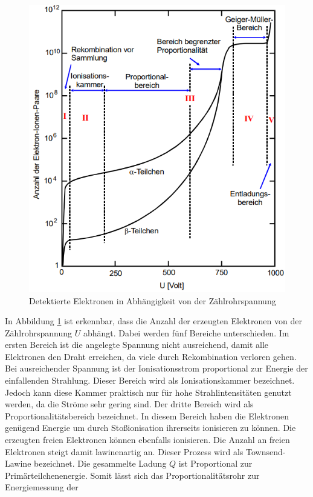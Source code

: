 \begin{figure}
    \centering
    \includegraphics[scale=0.6]{pics/Elektronen.png}
    \caption{Detektierte Elektronen in Abhängigkeit von der Zählrohrspannung}
    \label{fig:Elektronen}
  \end{figure}
In Abbildung \ref{fig:Elektronen} ist erkennbar, dass die Anzahl der erzeugten Elektronen von der Zählrohrspannung $U$ abhängt.
Dabei werden fünf Bereiche unterschieden. Im ersten Bereich ist die angelegte Spannung nicht ausreichend, damit alle Elektronen den Draht erreichen, da viele 
durch Rekombination verloren gehen.
Bei ausreichender Spannung ist der Ionisationsstrom proportional zur Energie der einfallenden Strahlung.
Dieser Bereich wird als Ionisationskammer bezeichnet.
Jedoch kann diese Kammer praktisch nur für hohe Strahlintensitäten genutzt werden, da die Ströme sehr gering sind.
Der dritte Bereich wird als Proportionalitätsbereich bezeichnet. In diesem Bereich haben die 
Elektronen genügend Energie um durch Stoßionisation ihrerseits ionisieren zu können.
Die erzeugten freien Elektronen können ebenfalls ionisieren. Die Anzahl an freien Elektronen steigt damit lawinenartig an. Dieser Prozess wird als
Townsend-Lawine bezeichnet. Die gesammelte Ladung $Q$ ist Proportional zur Primärteilchenenergie. Somit lässt sich das Proportionalitätsrohr zur Energiemessung der
